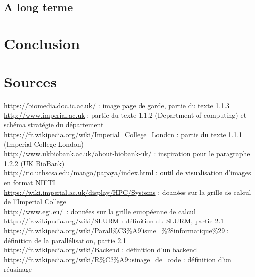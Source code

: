 \documentclass[10pt]{report}
\begin{document}
	\section{A long terme}

\chapter*{Conclusion} %
\chapter*{Sources}
\noindent
\url{https://biomedia.doc.ic.ac.uk/}  : image page de garde, partie du texte 1.1.3 \\
\url{http://www.imperial.ac.uk} : partie du texte 1.1.2 (Department of computing) et schéma stratégie du département\\
\url{https://fr.wikipedia.org/wiki/Imperial_College_London} : partie du texte 1.1.1 (Imperial College London)\\
\url{http://www.ukbiobank.ac.uk/about-biobank-uk/} : inspiration pour le paragraphe 1.2.2 (UK BioBank)\\
\url{http://ric.uthscsa.edu/mango/papaya/index.html} : outil de visualisation d'images en format NIFTI\\
\url{https://wiki.imperial.ac.uk/display/HPC/Systems} : données sur la grille de calcul de l'Imperial College\\
\url{http://www.egi.eu/} : données sur la grille européenne de calcul
\url{https://fr.wikipedia.org/wiki/SLURM} : définition du SLURM, partie 2.1\\
\url{https://fr.wikipedia.org/wiki/Parall\%C3\%A9lisme_\%28informatique\%29} : définition de la parallélisation, partie 2.1\\
\url{https://fr.wikipedia.org/wiki/Backend} : définition d'un backend\\
\url{https://fr.wikipedia.org/wiki/R\%C3\%A9usinage_de_code} :  définition d'un réusinage \\
\renewcommand{\listfigurename}{Table des illustations}
\listoffigures
{}
\end{document}

